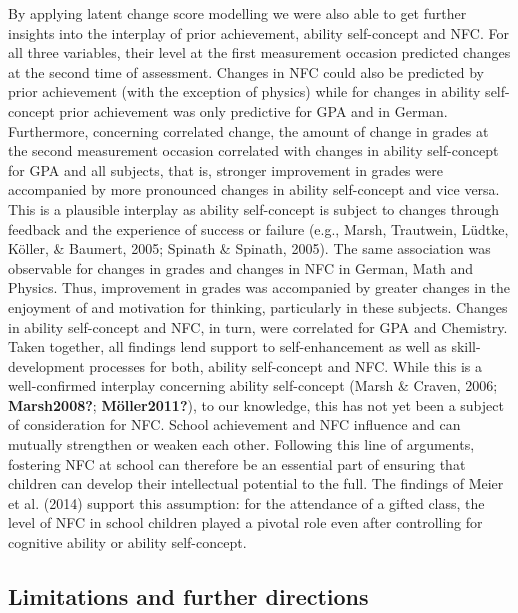 \documentclass[
  man]{apa6}
\begin{document}
By applying latent change score modelling we were also able to get further insights into the interplay of prior achievement, ability self-concept and NFC. For all three variables, their level at the first measurement occasion predicted changes at the second time of assessment. Changes in NFC could also be predicted by prior achievement (with the exception of physics) while for changes in ability self-concept prior achievement was only predictive for GPA and in German. Furthermore, concerning correlated change, the amount of change in grades at the second measurement occasion correlated with changes in ability self-concept for GPA and all subjects, that is, stronger improvement in grades were accompanied by more pronounced changes in ability self-concept and vice versa. This is a plausible interplay as ability self-concept is subject to changes through feedback and the experience of success or failure (e.g., Marsh, Trautwein, Lüdtke, Köller, \& Baumert, 2005; Spinath \& Spinath, 2005). The same association was observable for changes in grades and changes in NFC in German, Math and Physics. Thus, improvement in grades was accompanied by greater changes in the enjoyment of and motivation for thinking, particularly in these subjects. Changes in ability self-concept and NFC, in turn, were correlated for GPA and Chemistry. Taken together, all findings lend support to self-enhancement as well as skill-development processes for both, ability self-concept and NFC. While this is a well-confirmed interplay concerning ability self-concept (Marsh \& Craven, 2006; \textbf{Marsh2008?}; \textbf{Möller2011?}), to our knowledge, this has not yet been a subject of consideration for NFC. School achievement and NFC influence and can mutually strengthen or weaken each other. Following this line of arguments, fostering NFC at school can therefore be an essential part of ensuring that children can develop their intellectual potential to the full. The findings of Meier et al. (2014) support this assumption: for the attendance of a gifted class, the level of NFC in school children played a pivotal role even after controlling for cognitive ability or ability self-concept.

\hypertarget{limitations-and-further-directions}{%
\subsection{Limitations and further directions}\label{limitations-and-further-directions}}
\end{document}
